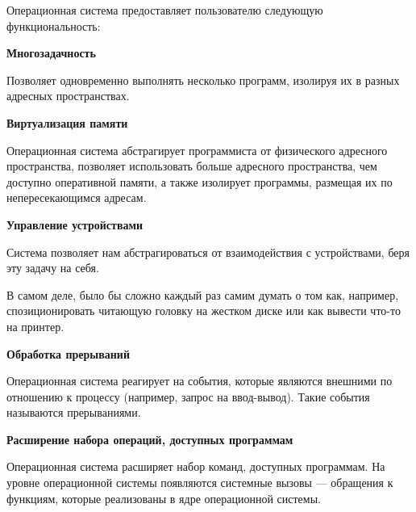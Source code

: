 Операционная система предоставляет пользователю следующую функциональность:

\textbf{Многозадачность}

Позволяет одновременно выполнять несколько программ, изолируя их в разных адресных пространствах.

\textbf{Виртуализация памяти}

Операционная система абстрагирует программиста от физического адресного пространства, позволяет использовать больше адресного пространства, чем доступно оперативной памяти, а также изолирует программы, размещая их по непересекающимся адресам.

\textbf{Управление устройствами}

Система позволяет нам абстрагироваться от взаимодействия с устройствами, беря эту задачу на себя.

В самом деле, было бы сложно каждый раз самим думать о том как, например, спозиционировать читающую головку на жестком диске или как вывести что-то на принтер.

\textbf{Обработка прерываний}

Операционная система реагирует на события, которые являются внешними по отношению к процессу (например, запрос на ввод-вывод). Такие события называются прерываниями.

\textbf{Расширение набора операций, доступных программам}

Операционная система расширяет набор команд, доступных программам. На уровне операционной системы появляются системные вызовы --- обращения к функциям, которые реализованы в ядре операционной системы. 